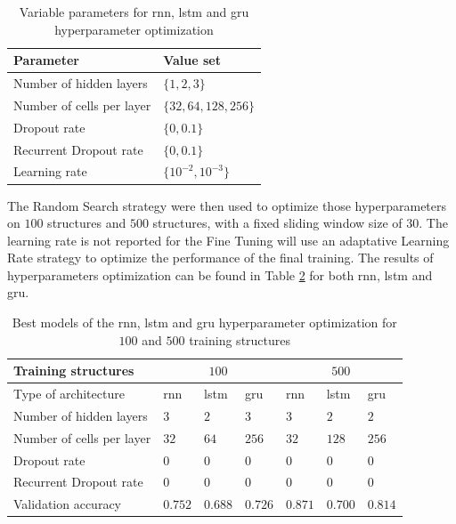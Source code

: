 \documentclass[conference]{IEEEtran}
\begin{document}
\begin{table}[htp]
	\centering
	\caption{Variable parameters for \gls{rnn}, \gls{lstm} and \gls{gru} hyperparameter optimization}
	\label{tab:variable_parameters_rnn_optimization}
	\begin{tabular}{ll}
		\textbf{Parameter} & \textbf{Value set} \\
		\hline
		Number of hidden layers & $ \{1, 2, 3\} $ \\
		Number of cells per layer & $ \{32, 64, 128, 256\} $ \\
		Dropout rate & $ \{0, 0.1\} $ \\
		Recurrent Dropout rate & $ \{0, 0.1\} $ \\
		Learning rate & $ \{10^{-2}, 10^{-3}\} $
	\end{tabular}
\end{table}

The Random Search strategy were then used to optimize those hyperparameters on $ 100 $ structures and $ 500 $ structures, with a fixed sliding window size of $30$. The learning rate is not reported for the Fine Tuning will use an adaptative Learning Rate strategy to optimize the performance of the final training. The results of hyperparameters optimization can be found in Table \ref{tab:results_parameters_rnn_optimization} for both \gls{rnn}, \gls{lstm} and \gls{gru}.

\begin{table}[htp]
	\centering
	\caption{Best models of the \gls{rnn}, \gls{lstm} and \gls{gru} hyperparameter optimization for $ 100 $ and $ 500 $ training structures}
	\label{tab:results_parameters_rnn_optimization}
	\setlength{\tabcolsep}{3pt} %
	\begin{tabular}{p{2.5cm}|lll|lll}
		Training structures & \multicolumn{3}{c}{$ 100 $} & \multicolumn{3}{c}{$ 500 $} \\
		\hline
		Type of architecture & \gls{rnn} & \gls{lstm} & \gls{gru} & \gls{rnn} & \gls{lstm} & \gls{gru}\\
		\hline
		Number of hidden layers & $3$ & $2$ & $3$ & $3$ & $2$ & $2$ \\
		Number of cells per layer & $32$ & $64$ & $256$ & $32$ & $128$ & $256$ \\
		Dropout rate & $0$ & $0$ & $0$ & $0$ & $0$ & $0$ \\
		Recurrent Dropout rate & $0$ & $0$ & $0$& $0$ & $0$ & $0$ \\
		\hline
		Validation accuracy & $0.752$ & $0.688$ & $0.726$ & $0.871$ & $0.700$ & $0.814$
	\end{tabular}
\end{table}
\end{document}
